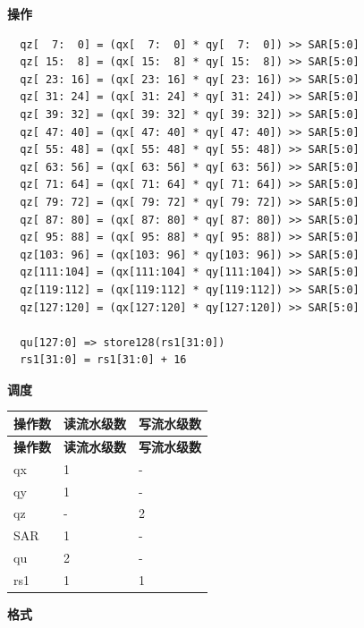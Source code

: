 \textbf{操作}\\
\begin{lstlisting}
  qz[  7:  0] = (qx[  7:  0] * qy[  7:  0]) >> SAR[5:0]
  qz[ 15:  8] = (qx[ 15:  8] * qy[ 15:  8]) >> SAR[5:0]
  qz[ 23: 16] = (qx[ 23: 16] * qy[ 23: 16]) >> SAR[5:0]
  qz[ 31: 24] = (qx[ 31: 24] * qy[ 31: 24]) >> SAR[5:0]
  qz[ 39: 32] = (qx[ 39: 32] * qy[ 39: 32]) >> SAR[5:0]
  qz[ 47: 40] = (qx[ 47: 40] * qy[ 47: 40]) >> SAR[5:0]
  qz[ 55: 48] = (qx[ 55: 48] * qy[ 55: 48]) >> SAR[5:0]
  qz[ 63: 56] = (qx[ 63: 56] * qy[ 63: 56]) >> SAR[5:0]
  qz[ 71: 64] = (qx[ 71: 64] * qy[ 71: 64]) >> SAR[5:0]
  qz[ 79: 72] = (qx[ 79: 72] * qy[ 79: 72]) >> SAR[5:0]
  qz[ 87: 80] = (qx[ 87: 80] * qy[ 87: 80]) >> SAR[5:0]
  qz[ 95: 88] = (qx[ 95: 88] * qy[ 95: 88]) >> SAR[5:0]
  qz[103: 96] = (qx[103: 96] * qy[103: 96]) >> SAR[5:0]
  qz[111:104] = (qx[111:104] * qy[111:104]) >> SAR[5:0]
  qz[119:112] = (qx[119:112] * qy[119:112]) >> SAR[5:0]
  qz[127:120] = (qx[127:120] * qy[127:120]) >> SAR[5:0]

  qu[127:0] => store128(rs1[31:0])
  rs1[31:0] = rs1[31:0] + 16
\end{lstlisting}


\textbf{调度}\\
\begin{longtable}[c]{|l|l|l|}
    \hline
    \rowcolor{lightgray}
    \textbf{操作数} & \textbf{读流水级数} & \textbf{写流水级数} \\\hline
    \endfirsthead
    \hline
    \rowcolor{lightgray}
     \textbf{操作数} & \textbf{读流水级数} & \textbf{写流水级数} \\\hline
    \endhead
    \hline
    \endfoot

    qx & 1 & - \\\hline
  qy & 1 & - \\\hline
     qz & - & 2 \\\hline
    SAR & 1 & - \\\hline
    qu & 2 & - \\\hline
    rs1 & 1 & 1

\end{longtable}

\textbf{格式}\\

